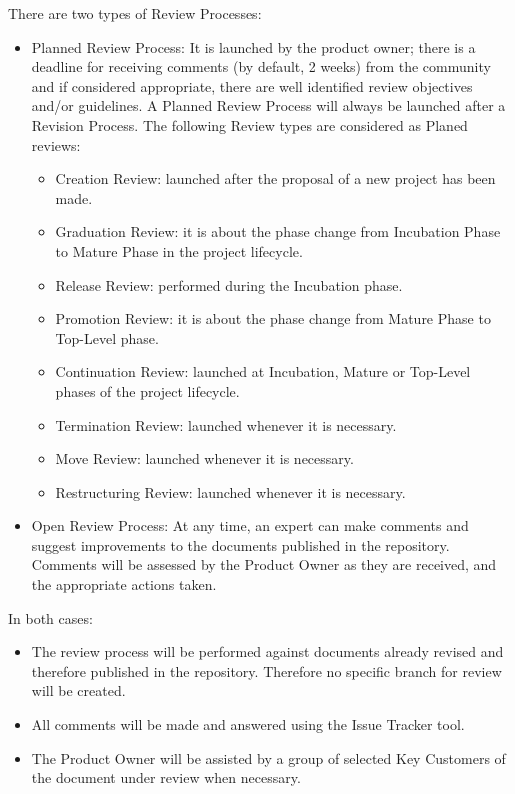\documentclass{template/openetcs_article}
\begin{document}
There are two types of Review Processes:
\begin{itemize}
\item Planned Review Process: It is launched by the product owner; there is a deadline for receiving comments (by default, 2 weeks) from the community and if considered appropriate, there are well identified review objectives and/or guidelines. A Planned Review Process will always be launched after a Revision Process. 
The following Review types are considered as Planed reviews:
\begin{itemize}
\item Creation Review: launched after the proposal of a new project has been made.
\item Graduation Review: it is about the phase change from Incubation Phase to Mature Phase in the project lifecycle.
\item Release Review: performed during the Incubation phase.
\item Promotion Review: it is about the phase change from Mature Phase to Top-Level phase.
\item Continuation Review: launched at Incubation, Mature or Top-Level phases of the project lifecycle.
\item Termination Review: launched whenever it is necessary.
\item Move Review: launched whenever it is necessary.
\item Restructuring Review: launched whenever it is necessary.
\end{itemize}
\item Open Review Process: At any time, an expert can make comments and suggest improvements to the documents published in the repository. Comments will be assessed by the Product Owner as they are received, and the appropriate actions taken.
\end{itemize}

In both cases:
\begin{itemize}
\item The review process will be performed against documents already revised and therefore published in the repository. Therefore no specific branch for review will be created.
\item All comments will be made and answered using the Issue Tracker tool.
\item The Product Owner will be assisted by a group of selected Key Customers of the document under review when necessary.
\end{itemize}
\end{document}
